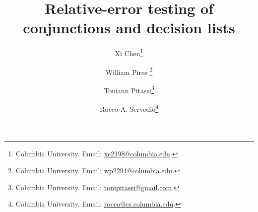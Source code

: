 \documentclass[11pt]{article}
\author{
Xi Chen\thanks{Columbia University. Email: \url{xc2198@columbia.edu}.} \and 
William Pires \thanks{Columbia University. Email: \url{wp2294@columbia.edu}.} \and 
Toniann Pitassi\thanks{Columbia University. Email: \url{tonipitassi@gmail.com}.} \and 
Rocco A. Servedio\thanks{Columbia University. Email: \url{rocco@cs.columbia.edu}.} 
}
\theoremstyle{definition}
\begin{document}
\setcounter{section}{0}

\title{Relative-error testing of conjunctions and decision lists}

\newcommand{\red}[1]{{\color{red} {#1}}}
\newcommand{\blue}[1]{{\color{blue} {#1}}}
\newcommand{\gray}[1]{{\color{gray} {#1}}}

\newcommand{\xnote}[1]{\footnote{{\bf \color{purple}Xi}: {#1}}}
\newcommand{\rnote}[1]{\footnote{{\bf \color{red}Rocco}: {#1}}}
\newcommand{\toni}[1]{\footnote{{\bf\color{blue} toni}: {#1}}} 
\newcommand{\wnote}[1]{\footnote{{\bf \color{teal}Will}: {#1}}}



\newcommand{\bxO}{\mathbf{x^1}}
\newcommand{\bxT}{\mathbf{x^2}}
\newcommand{\bxTh}{\mathbf{x^3}}

\newcommand{\byO}{\mathbf{y^1}}
\newcommand{\byT}{\mathbf{y^2}}
\newcommand{\byTh}{\mathbf{y^3}}


\newcommand{\bGamma}{\mathbf{\Gamma}}








\newcommand{\uth}{\bigskip \bigskip{\huge{\bf UP TO HERE} \bigskip \bigskip}}
\newcommand{\SAMP}{\mathrm{Samp}}
\newcommand{\MQ}{\mathrm{MQ}}

\newcommand{\reldist}{\mathrm{rel}\text{-}\mathrm{dist}}



\newcommand{\default}{\ensuremath{\mathsf{default}}}

\newcommand\Algphase[1]{\Statex\hspace*{\dimexpr-\algorithmicindent-2pt\relax}\Statex\hspace*{-\algorithmicindent}\textbf{#1}\Statex\hspace*{\dimexpr-\algorithmicindent-2pt\relax}}


\thispagestyle{empty}


\maketitle
\end{document}

